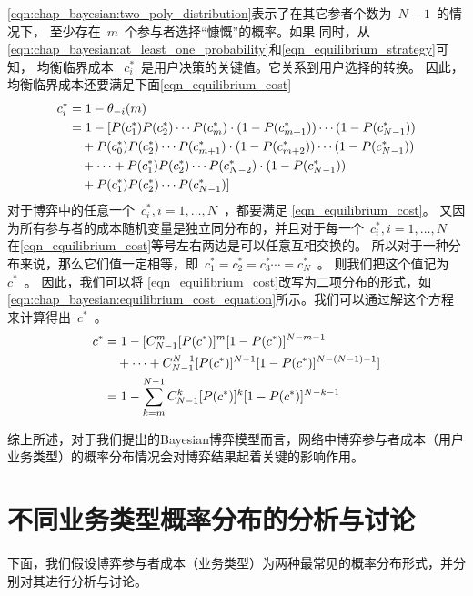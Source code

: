 \eqref{eqn:chap_bayesian:two_poly_distribution}表示了在其它参者个数为~$N-1$~的情况下，
至少存在~$m$~个参与者选择“慷慨”的概率。如果
同时，从\eqref{eqn:chap_bayesian:at_least_one_probability}和\eqref{eqn_equilibrium_strategy}可知，
均衡临界成本 ~$c_i^*$~是用户决策的关键值。它关系到用户选择的转换。
因此，均衡临界成本还要满足下面\eqref{eqn_equilibrium_cost}
\begin{align}
    c_i^* &= 1 - \theta_{-i} (m) \notag \\
     & =1 - [P(c_1^*)P(c_2^*)\cdots P(c_{m}^*) \cdot (1-P(c_{m+1}^*)) \cdots(1-P(c_{N-1}^*)) \notag \\ 
    & \quad +  P(c_0^*)P(c_2^*)\cdots P(c_{m+1}^*) \cdot (1-P(c_{m+2}^*)) \cdots(1-P(c_{N-1}^*)) \notag \\ 
    & \quad + \cdots  + P(c_1^*)P(c_2^*)\cdots P(c_{N-2}^*) \cdot (1-P(c_{N-1}^*)) \notag \\
    & \quad +  P(c_1^*)P(c_2^*)\cdots P(c_{N-1}^*) ]
    \label{eqn_equilibrium_cost} 
\end{align}
对于博弈中的任意一个~$c_i^*, i=1,\ldots, N$~，都要满足
\eqref{eqn_equilibrium_cost}。
又因为所有参与者的成本随机变量是独立同分布的，并且对于每一个~$c_i^*, i=1,\ldots, N$~
在\eqref{eqn_equilibrium_cost}等号左右两边是可以任意互相交换的。
所以对于一种分布来说，那么它们值一定相等，即~$c_1^* = c_2^* = c_3^* \cdots = c_N^*$~。
则我们把这个值记为~$c^*$~。
因此，我们可以将 \eqref{eqn_equilibrium_cost}改写为二项分布的形式，如
\eqref{eqn:chap_bayesian:equilibrium_cost_equation}所示。我们可以通过解这个方程来计算得出~$c^*$~。
\begin{align}  
    c^* & =  1 - [ C_{N-1}^m [P(c^*)]^m [1-P(c^*)]^{N-m-1} \notag \\
   & \quad + \cdots + C_{N-1}^{N-1} [P(c^*)]^{N-1} [1-P(c^*)]^{N-(N-1)-1} ]\notag \\
   &= 1- \sum_{k=m}^{N-1}C_{N-1}^k [P(c^*)]^k [1-P(c^*)]^{N-k-1}
\label{eqn:chap_bayesian:equilibrium_cost_equation}
\end{align}

综上所述，对于我们提出的Bayesian博弈模型而言，网络中博弈参与者成本（用户业务类型）的概率分布情况会对博弈结果起着关键的影响作用。
\section{不同业务类型概率分布的分析与讨论}
下面，我们假设博弈参与者成本（业务类型）为两种最常见的概率分布形式，并分别对其进行分析与讨论。
